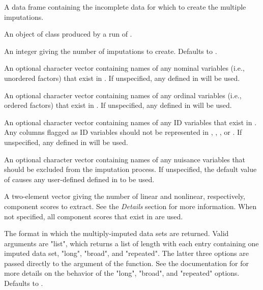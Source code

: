 \documentclass[letterpaper]{book}
\begin{document}
\begin{Arguments}
\begin{ldescription}
\item[\code{rawData}] 
A data frame containing the incomplete data for which to create
the multiple imputations.

\item[\code{pcAuxData}] 
An object of class  produced by a run of
.

\item[\code{nImps}] 
An integer giving the number of imputations to create. Defaults to
.

\item[\code{nomVars}] 
An optional character vector containing names of any nominal
variables (i.e., unordered factors) that exist in . If
unspecified, any  defined in  will be
used.

\item[\code{ordVars}] 
An optional character vector containing names of any ordinal
variables (i.e., ordered factors) that exist in . If
unspecified, any  defined in  will be
used.

\item[\code{idVars}] 
An optional character vector containing names of any ID variables
that exist in . Any columns flagged as ID variables
should not be represented in , ,
, or . If unspecified, any
 defined in  will be used.

\item[\code{dropVars}] 
An optional character vector containing names of any nuisance
variables that should be excluded from the imputation process. If
unspecified, the default value of 
causes any user-defined  defined in 
to be used.

\item[\code{nComps}] 
A two-element vector giving the number of linear and
nonlinear, respectively, component scores to extract. See the
\emph{Details} section for more information. When not specified, all
component scores that exist in  are used.

\item[\code{compFormat}] 
The format in which the multiply-imputed data sets are
returned. Valid arguments are "list", which returns a list of length
 with each entry containing one imputed data set,
"long", "broad", and "repeated". The latter three options are passed
directly to the  argument of the 
function. See the documentation for  for more
details on the behavior of the "long", "broad", and "repeated"
options. Defaults to . 


\end{ldescription}
\end{Arguments}
\end{document}
